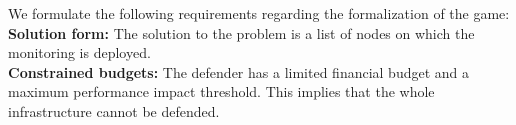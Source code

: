 \label{sec:mdp-reqiorements}
We formulate the following requirements regarding the formalization of the game:\\
\textbf{Solution form: } The solution to the problem is a list of nodes on which the monitoring is deployed.\\
\textbf{Constrained budgets: } The defender has a limited financial budget and a maximum performance impact threshold.
This implies that the whole infrastructure cannot be defended.\\

